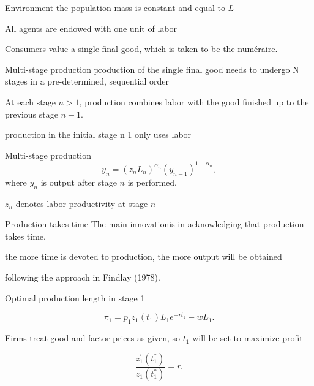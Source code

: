 \documentclass[aspectratio=1610]{beamer}
\begin{document}
\begin{frame}{Environment}
\Large 
the population mass is constant and equal to $L$

\vspace{1cm}

All agents  are endowed with one unit of labor

\vspace{1cm}

Consumers value a single final good, which is taken to be the numéraire.

\end{frame}

\begin{frame}{Multi-stage production}
\Large
production of the single final good  needs to undergo N stages in a pre-determined, sequential order

\vspace{1cm}

At each stage $n>1$, production  combines labor with the good finished up to the previous stage $n-1$.

\vspace{1cm}

production in the initial  stage n 1 only uses labor


\end{frame}

\begin{frame}{Multi-stage production}
\Large
$$y_{n} = \left(z_{n} L_{n}\right)^{\alpha_{n}} \left(y_{n-1}\right)^{1-\alpha_{n}},$$
\vspace{1cm}
where $y_n$ is output after stage $n$ is performed.

$z_n$ denotes labor productivity at stage $n$
\vspace{1cm}

    
\end{frame}

\begin{frame}{Production takes time}
\Large
The main innovationis in acknowledging that production takes time.

\vspace{1cm}

the more time is devoted  to production, the more output will be obtained 

\vspace{1cm}
following the approach in Findlay (1978).
\end{frame}

\begin{frame}{Optimal production length}
\Large 
in stage 1

$$\pi_{1} = p_{1} z_{1}(t_{1}) L_{1} e^{-rt_{1}} - wL_{1}.$$

Firms treat good and factor prices as given, so $t_1$ will be set to maximize  profit

$$\frac{z_{1}^{\prime}(t_{1}^{*})}{z_{1}(t_{1}^{*})} = r.$$
\end{frame}
\end{document}
